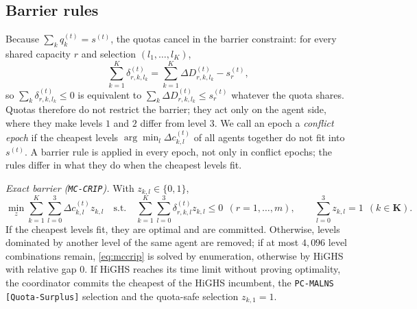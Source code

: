 \documentclass[a4paper,fleqn]{cas-sc}
\newcommand{\mcc}{\texttt{MC-CRIP}}
\newcommand{\pqs}{\texttt{PC-MALNS [Quota-Surplus]}}
\begin{document}
\subsection{Barrier rules}
\label{sec:barrier}
Because $\sum_k q_k^{(t)} = s^{(t)}$, the quotas cancel in the barrier constraint: for every shared capacity $r$ and selection $(l_1,\dots,l_K)$,
\begin{equation}
    \sum_{k=1}^{K} \delta_{r,k,l_k}^{(t)} = \sum_{k=1}^{K} \Delta D_{r,k,l_k}^{(t)} - s_r^{(t)}, \label{eq:cancellation}
\end{equation}
so $\sum_k \delta_{r,k,l_k}^{(t)} \le 0$ is equivalent to $\sum_k \Delta D_{r,k,l_k}^{(t)} \le s_r^{(t)}$ whatever the quota shares. Quotas therefore do not restrict the barrier; they act only on the agent side, where they make levels $1$ and $2$ differ from level $3$. We call an epoch a \emph{conflict epoch} if the cheapest levels $\arg\min_l \Delta c_{k,l}^{(t)}$ of all agents together do not fit into $s^{(t)}$. A barrier rule is applied in every epoch, not only in conflict epochs; the rules differ in what they do when the cheapest levels fit.

\textit{Exact barrier (\mcc).} With $z_{k,l} \in \{0,1\}$,
\begin{equation}
    \min_z \sum_{k=1}^{K}\sum_{l=0}^{3} \Delta c_{k,l}^{(t)} z_{k,l} \quad \text{s.t.} \quad \sum_{k=1}^{K}\sum_{l=0}^{3} \delta_{r,k,l}^{(t)} z_{k,l} \le 0 \ \ (r = 1,\dots,m), \qquad \sum_{l=0}^{3} z_{k,l} = 1 \ \ (k \in \mathbf{K}). \label{eq:mccrip}
\end{equation}
If the cheapest levels fit, they are optimal and are committed. Otherwise, levels dominated by another level of the same agent are removed; if at most $4{,}096$ level combinations remain, \eqref{eq:mccrip} is solved by enumeration, otherwise by HiGHS \citep{huangfu2018} with relative gap $0$. If HiGHS reaches its time limit without proving optimality, the coordinator commits the cheapest of the HiGHS incumbent, the \pqs{} selection and the quota-safe selection $z_{k,1} = 1$.
\end{document}
